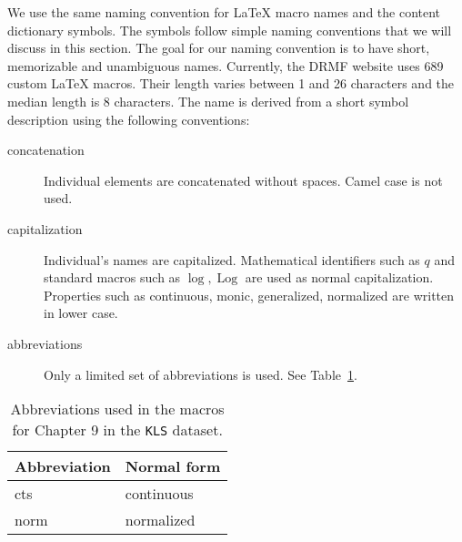 \documentclass[]{article}
\begin{document}
We use the same naming convention for \LaTeX{} macro names and the content dictionary symbols.
The symbols follow simple naming conventions that we will discuss in this section.
The goal for our naming convention is to have short, memorizable and unambiguous names.
Currently, the DRMF website uses 689 custom \LaTeX{} macros.
Their length varies between 1 and 26 characters and the median length is 8 characters.
The name is derived from a short symbol description using the following conventions:
\begin{description}
                                                                                                                                                                                                                                                                                                                                                                                                                                                                                                                                                                                                                                                                                                                                                                                                                                                                                                                                                                                                                                                                 \item[concatenation] Individual elements are concatenated without spaces.
  Camel case is not used.
  \item[capitalization] Individual's names are capitalized.
  Mathematical identifiers such as $q$ and standard macros such as $\log, \operatorname{Log}$ are used as normal capitalization.
  Properties such as continuous, monic, generalized, normalized are written in lower case.
  \item[abbreviations] Only a limited set of abbreviations is used. See Table~\ref{tb.ab}.
\end{description}
    \begin{table}
        \caption{Abbreviations used in the macros for Chapter 9 %
    in the {\tt KLS} dataset.\label{tb.ab}}
        \vspace{0.2cm}
        \centering
        \begin{tabular}{|l|l|}
            \hline
            \textbf{Abbreviation} & \textbf{Normal form} \\
            \hline
    cts & continuous\\\hline
    norm & normalized\\\hline
        \end{tabular}
    \end{table}
\end{document}
